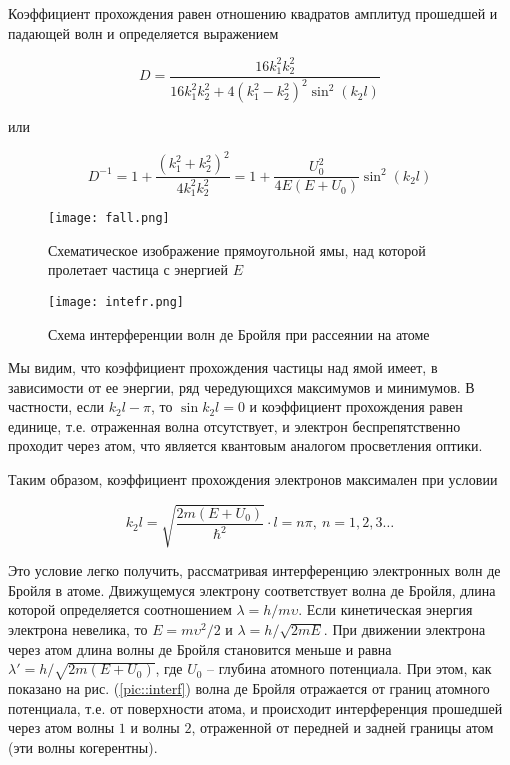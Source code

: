 Коэффициент прохождения равен отношению квадратов амплитуд прошедшей и падающей
волн и определяется выражением

\begin{equation}
  D = \frac{16 k_1^2 k_2^2}
  {16 k_1^2 k_2^2 + 4 (k_1^2 - k_2^2)^2 \sin^2(k_2 l)}
\end{equation}

или

\begin{equation}
  D^{-1} = 1 + \frac{(k_1^2 + k_2^2)^2}{4 k_1^2 k_2^2}
   = 1 + \frac{U_0^2}{4 E (E + U_0)} \sin^2 (k_2 l)
\end{equation}

\begin{figure}
  \texttt{[image: fall.png]}
  \caption{Схематическое изображение прямоугольной ямы, над которой пролетает
  частица с энергией $E$}
  \label{pic::fall}

  \texttt{[image: intefr.png]}
  \caption{Схема интерференции волн де Бройля при рассеянии на атоме}
  \label{pic::interf}
\end{figure}

Мы видим, что коэффициент прохождения частицы над ямой имеет, в зависимости от
ее энергии, ряд чередующихся максимумов и минимумов. В частности, если $k_2 l -
\pi$, то $\sin k_2 l = 0$ и коэффициент прохождения равен единице, т.е.
отраженная волна отсутствует, и электрон беспрепятственно проходит через атом,
что является квантовым аналогом просветления оптики.

Таким образом, коэффициент прохождения электронов максимален при условии

\begin{equation} \label{eq::max_cond}
  k_2 l = \sqrt{\frac{2 m (E + U_0)}{\hbar^2}} \cdot l = n \pi, \: n = 1, 2, 3 \dots
\end{equation}

Это условие легко получить, рассматривая интерференцию электронных волн де
Бройля в атоме. Движущемуся электрону соответствует волна де Бройля, длина
которой определяется соотношением $\lambda = h / m \upsilon$. Если кинетическая
энергия электрона невелика, то $E = m \upsilon^2 / 2$ и $\lambda = h / \sqrt{2 m
E}$. При движении электрона через атом длина волны де Бройля становится меньше и
равна $\lambda'= h / \sqrt{2 m (E + U_0)}$, где $U_0$ -- глубина атомного
потенциала. При этом, как показано на рис. (\eqref{pic::interf}) волна де Бройля
отражается от границ атомного потенциала, т.е. от поверхности атома, и
происходит интерференция прошедшей через атом волны $1$ и волны $2$, отраженной
от передней и задней границы атом (эти волны когерентны).

